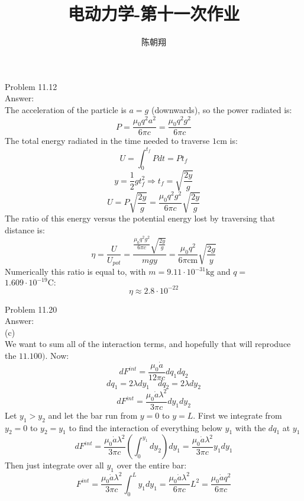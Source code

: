 \documentclass[UTF8]{ctexart}
\title{电动力学-第十一次作业}
\author{陈朝翔}
\begin{document}
	\maketitle
	Problem 11.12\\
	Answer:\\
	The acceleration of the particle is $a=g$ (downwards), so the power radiated is:
	$$P=\frac{\mu_{0} q^{2} a^{2}}{6 \pi c}=\frac{\mu_{0} q^{2} g^{2}}{6 \pi c}$$
	The total energy radiated in the time needed to traverse $1 \mathrm{cm}$ is:
	$$U=\int_{0}^{t_{f}} P d t=P t_{f}$$
	$$y=\frac{1}{2} g t_{f}^{2} \Longrightarrow t_{f}=\sqrt{\frac{2 y}{g}}$$
	$$U=P \sqrt{\frac{2 y}{g}}=\frac{\mu_{0} q^{2} g^{2}}{6 \pi c} \sqrt{\frac{2 y}{g}}$$
	The ratio of this energy versus the potential energy lost by traversing that distance is:
	$$\eta=\frac{U}{U_{p o t}}=\frac{\frac{\mu_{0} q^{2} g^{2}}{6 \pi c} \sqrt{\frac{2 y}{g}}}{m g y}=\frac{\mu_{0} q^{2}}{6 \pi \mathrm{cm}} \sqrt{\frac{2 g}{y}}$$
	Numerically this ratio is equal to, with $m=9.11 \cdot 10^{-31} \mathrm{kg}$ and $q=$ $1.609 \cdot 10^{-19} \mathrm{C}:$
	$$\eta \approx 2.8 \cdot 10^{-22}$$
	
	Problem 11.20\\
	Answer:\\
	(c)\\
	We want to sum all of the interaction terms, and hopefully that will reproduce the $11.100) .$ Now:
	$$d F^{i n t}=\frac{\mu_{0} \dot{a}}{12 \pi c} d q_{1} d q_{2}$$
	$$d q_{1}=2 \lambda d y_{1} \quad d q_{2}=2 \lambda d y_{2}$$
	$$d F^{i n t}=\frac{\mu_{0} \dot{a} \lambda^{2}}{3 \pi c} d y_{1} d y_{2}$$
	Let $y_{1}>y_{2}$ and let the bar run from $y=0$ to $y=L$. First we integrate from $y_{2}=0$ to $y_{2}=y_{1}$ to find the interaction of everything below $y_{1}$ with the $d q_{1}$ at $y_{1}$
	$$d F^{i n t}=\frac{\mu_{0} \dot{a} \lambda^{2}}{3 \pi c}\left(\int_{0}^{y_{1}} d y_{2}\right) d y_{1}=\frac{\mu_{0} \dot{a} \lambda^{2}}{3 \pi c} y_{1} d y_{1}$$
	Then just integrate over all $y_{1}$ over the entire bar:
	$$F^{i n t}=\frac{\mu_{0} \dot{a} \lambda^{2}}{3 \pi c} \int_{0}^{L} y_{1} d y_{1}=\frac{\mu_{0} \dot{a} \lambda^{2}}{6 \pi c} L^{2}=\frac{\mu_{0} \dot{a} q^{2}}{6 \pi c}$$
	
\end{document}
